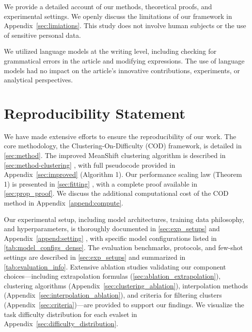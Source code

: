 We provide a detailed account of our methods, theoretical proofs, and experimental settings. We openly discuss the limitations of our framework in Appendix~\ref{sec:limiations}. This study does not involve human subjects or the use of sensitive personal data.

We utilized language models at the writing level, including checking for grammatical errors in the article and modifying expressions. The use of language models had no impact on the article's innovative contributions, experiments, or analytical perspectives.



\section*{Reproducibility Statement}
We have made extensive efforts to ensure the reproducibility of our work. The core methodology, the Clustering-On-Difficulty (COD) framework, is detailed in \cref{sec:method}. The improved MeanShift clustering algorithm is described in \cref{sec:method-clustering} , with full pseudocode provided in Appendix~\ref{sec:improved} (Algorithm 1). Our performance scaling law (Theorem 1) is presented in \cref{sec:fitting} , with a complete proof available in \cref{sec:prop_proof}. We discuss the additional computational cost of the COD method in Appendix~\ref{append:compute}.

Our experimental setup, including model architectures, training data philosophy, and hyperparameters, is thoroughly documented in \cref{sec:exp_setups} and Appendix~\ref{append:setting} , with specific model configurations listed in \cref{tab:model_configs_dense}. The evaluation benchmarks, protocols, and few-shot settings are described in \cref{sec:exp_setups} and summarized in \cref{tab:evaluation_info}. Extensive ablation studies validating our component choices—including extrapolation formulas (\cref{sec:ablation_extrapolation}), clustering algorithms (Appendix~\ref{sec:clustering_ablation}), interpolation methods (Appendix~\ref{sec:interpolation_ablation}), and criteria for filtering clusters (Appendix~\ref{sec:criteria})—are provided to support our findings. We visualize the task difficulty distribution for each evalset in Appendix~\ref{sec:difficulty_distribution}.